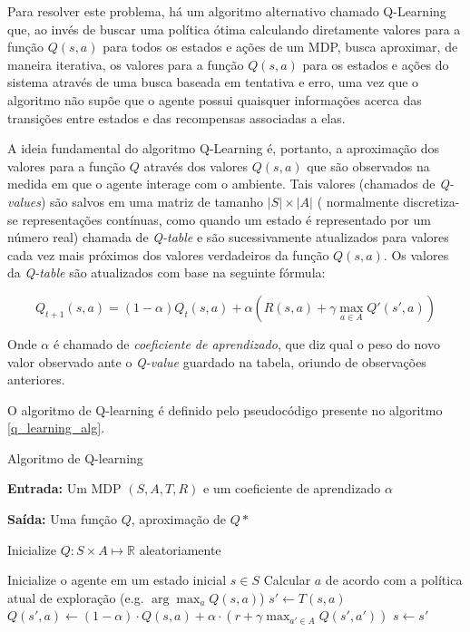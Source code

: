 \documentclass[cic,tc]{iiufrgs}
\begin{document}
Para resolver este problema, há um algoritmo alternativo chamado Q-Learning
\cite{Wattkins1989} que,
ao invés de buscar uma política ótima calculando diretamente valores para a
função $Q(s, a)$ para todos os estados e ações de um MDP, busca aproximar, de
maneira iterativa, os valores para a função $Q(s, a)$ para os estados e ações do
sistema através de uma busca baseada em tentativa e erro, uma vez que o algoritmo
não supõe que o agente possui quaisquer informações acerca das transições entre
estados e das recompensas associadas a elas.


A ideia fundamental do algoritmo Q-Learning é, portanto, a aproximação dos
valores para a função $Q$ através dos valores $Q(s, a)$ que são observados na
medida em que o agente interage com o ambiente. Tais valores (chamados de
\textit{Q-values}) são salvos em uma matriz de tamanho $|S| \times |A|$ (
normalmente discretiza-se representações contínuas, como quando um estado é
representado por um número real) chamada de \textit{Q-table} e são
sucessivamente atualizados para valores cada vez mais próximos dos valores
verdadeiros da função $Q(s, a)$. Os valores da \textit{Q-table} são atualizados
com base na seguinte fórmula:

\begin{equation}
  \label{q_learning_update}
  Q_{t+1}(s, a) = (1 - \alpha)Q_t(s, a) + \alpha(R(s, a) + \gamma\max_{a \in A}Q'(s', a))
\end{equation}

Onde $\alpha$ é chamado de \textit{coeficiente de aprendizado}, que diz qual o
peso do novo valor observado ante o \textit{Q-value} guardado na tabela, oriundo
de observações anteriores.

O algoritmo de Q-learning é definido pelo pseudocódigo presente no algoritmo
\ref{q_learning_alg}.


\begin{algorithm}
  \label{q_learning_alg}
\caption{Algoritmo de Q-learning}

\textbf{Entrada:}  Um MDP $(S, A, T, R)$ e um coeficiente de aprendizado $\alpha$


\textbf{Saída:} Uma função $Q$, aproximação de $Q*$


\begin{algorithmic}[1]
  \State Inicialize $Q: S \times A\mapsto \mathbb{R} $ aleatoriamente

  \Repeat
    \State Inicialize o agente em um estado inicial $s \in S$
      \State Calcular $a$ de acordo com a política atual de exploração (e.g. $\arg \max_a Q(s,a)$)
      \State $s' \gets T(s, a)$
      \State $Q(s', a) \gets (1 - \alpha)\cdot Q(s,a) + \alpha \cdot (r + \gamma\max_{a' \in A}Q(s', a'))$
      \State $s \gets s'$
    \EndWhile
\EndFunction
\end{algorithmic}
\end{algorithm}
\end{document}
